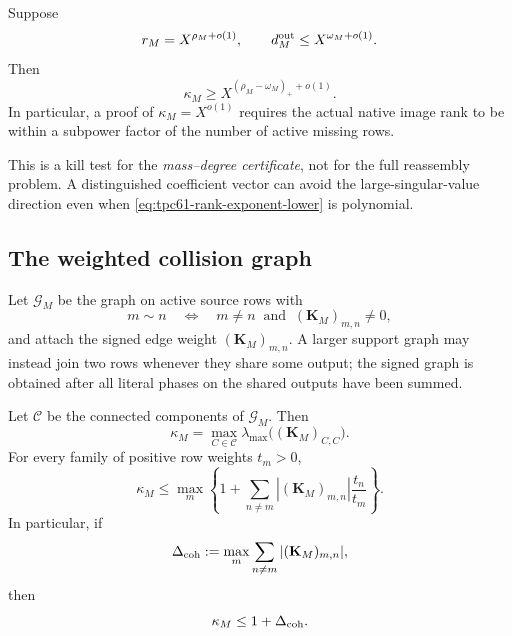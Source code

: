 \begin{corollary}
\label{cor:tpc61-rank-kill}
Suppose
\begin{equation}
 r_M=X^{\rho_M+o(1)},
 \qquad
 d_M^{\rm out}\le X^{\omega_M+o(1)}.
 \label{eq:tpc61-rank-exponents}
\end{equation}
Then
\begin{equation}
 \boxed{
 \kappa_M\ge
 X^{(\rho_M-\omega_M)_++o(1)}.}
 \label{eq:tpc61-rank-exponent-lower}
\end{equation}
In particular, a proof of \(\kappa_M=X^{o(1)}\) requires the actual native
image rank to be within a subpower factor of the number of active missing
rows.
\end{corollary}

This is a kill test for the \emph{mass--degree certificate}, not for the
full reassembly problem.  A distinguished coefficient vector can avoid
the large-singular-value direction even when
\eqref{eq:tpc61-rank-exponent-lower} is polynomial.

\subsection{The weighted collision graph}

Let \(\mathscr G_M\) be the graph on active source rows with
\begin{equation}
 m\sim n
 \quad\Longleftrightarrow\quad
 m\ne n\ \text{ and }\ (\mathbf K_M)_{m,n}\ne0,
 \label{eq:tpc61-collision-graph}
\end{equation}
and attach the signed edge weight \((\mathbf K_M)_{m,n}\).  A larger
support graph may instead join two rows whenever they share some output;
the signed graph is obtained after all literal phases on the shared outputs
have been summed.

\begin{theorem}
\label{thm:tpc61-graph-schur}
Let \(\mathscr C\) be the connected components of
\(\mathscr G_M\).  Then
\begin{equation}
 \boxed{
 \kappa_M
 =\max_{C\in\mathscr C}
   \lambda_{\max}\bigl((\mathbf K_M)_{C,C}\bigr).}
 \label{eq:tpc61-component-maximum}
\end{equation}
For every family of positive row weights \(t_m>0\),
\begin{equation}
 \boxed{
 \kappa_M
 \le
 \max_m\left\{
  1+\sum_{n\ne m}
  |(\mathbf K_M)_{m,n}|\frac{t_n}{t_m}
 \right\}.}
 \label{eq:tpc61-weighted-graph-schur}
\end{equation}
In particular, if
\begin{equation}
 \Delta_{\rm coh}
 :=\max_m\sum_{n\ne m}|(\mathbf K_M)_{m,n}|,
 \label{eq:tpc61-coherent-degree}
\end{equation}
then
\begin{equation}
 \kappa_M\le1+\Delta_{\rm coh}.
 \label{eq:tpc61-unweighted-coherent-degree}
\end{equation}
\end{theorem}

